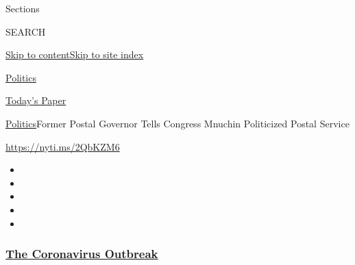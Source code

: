 Sections

SEARCH

\protect\hyperlink{site-content}{Skip to
content}\protect\hyperlink{site-index}{Skip to site index}

\href{https://www.nytimes3xbfgragh.onion/section/politics}{Politics}

\href{https://myaccount.nytimes3xbfgragh.onion/auth/login?response_type=cookie\&client_id=vi}{}

\href{https://www.nytimes3xbfgragh.onion/section/todayspaper}{Today's
Paper}

\href{/section/politics}{Politics}\textbar{}Former Postal Governor Tells
Congress Mnuchin Politicized Postal Service

\url{https://nyti.ms/2QbKZM6}

\begin{itemize}
\item
\item
\item
\item
\item
\end{itemize}

\hypertarget{the-coronavirus-outbreak}{%
\subsubsection{\texorpdfstring{\href{https://www.nytimes3xbfgragh.onion/news-event/coronavirus?name=styln-coronavirus-national\&region=TOP_BANNER\&block=storyline_menu_recirc\&action=click\&pgtype=Article\&impression_id=e0ac8a30-f279-11ea-afab-150d323ee948\&variant=undefined}{The
Coronavirus
Outbreak}}{The Coronavirus Outbreak}}\label{the-coronavirus-outbreak}}

